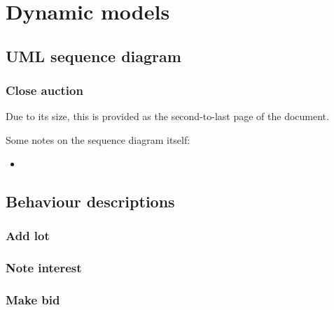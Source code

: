 \documentclass[titlepage, 12pt]{extarticle}
\begin{document}
\section{Dynamic models}
\subsection{UML sequence diagram}
\subsubsection{Close auction}
Due to its size, this is provided as the second-to-last page of the document.

\noindent Some notes on the sequence diagram itself:
\begin{itemize}
  \item 
\end{itemize}

\subsection{Behaviour descriptions}
\subsubsection{Add lot}
\subsubsection{Note interest}
\subsubsection{Make bid}



\end{document}
